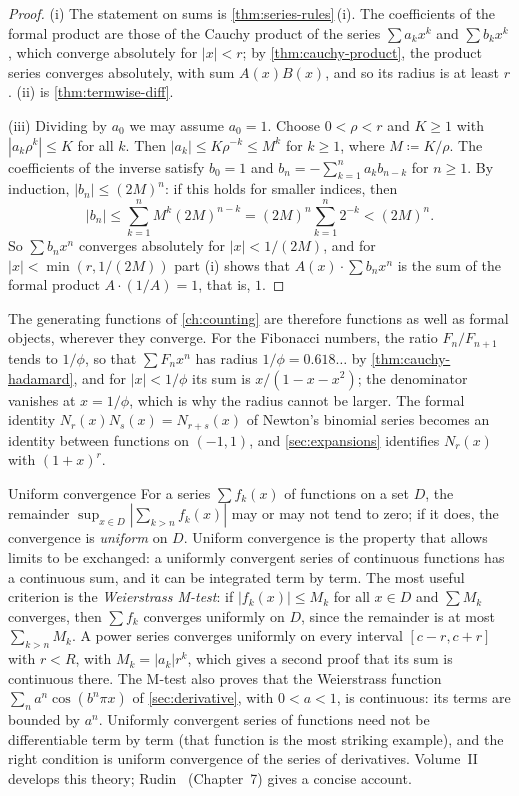 \begin{proof}
(i) The statement on sums is \cref{thm:series-rules}\,(i). The coefficients of the formal product are those of the Cauchy product of the series $\sum a_kx^k$ and $\sum b_kx^k$, which converge absolutely for $|x|<r$; by \cref{thm:cauchy-product}, the product series converges absolutely, with sum $A(x)B(x)$, and so its radius is at least $r$. (ii) is \cref{thm:termwise-diff}.

(iii) Dividing by $a_0$ we may assume $a_0=1$. Choose $0<\rho<r$ and $K\ge1$ with $|a_k\rho^k|\le K$ for all $k$. Then $|a_k|\le K\rho^{-k}\le M^k$ for $k\ge1$, where $M\coloneqq K/\rho$. The coefficients of the inverse satisfy $b_0=1$ and $b_n=-\sum_{k=1}^na_kb_{n-k}$ for $n\ge1$. By induction, $|b_n|\le(2M)^n$: if this holds for smaller indices, then
\[
|b_n|\le\sum_{k=1}^nM^k(2M)^{n-k}=(2M)^n\sum_{k=1}^n2^{-k}<(2M)^n .
\]
So $\sum b_nx^n$ converges absolutely for $|x|<1/(2M)$, and for $|x|<\min(r,1/(2M))$ part (i) shows that $A(x)\cdot\sum b_nx^n$ is the sum of the formal product $A\cdot(1/A)=1$, that is, $1$.
\end{proof}

The generating functions of \cref{ch:counting} are therefore functions as well as formal objects, wherever they converge. For the Fibonacci numbers, the ratio $F_n/F_{n+1}$ tends to $1/\phi$, so that $\sum F_nx^n$ has radius $1/\phi=0.618\ldots$ by \cref{thm:cauchy-hadamard}, and for $|x|<1/\phi$ its sum is $x/(1-x-x^2)$; the denominator vanishes at $x=1/\phi$, which is why the radius cannot be larger. The formal identity $N_r(x)N_s(x)=N_{r+s}(x)$ of Newton's binomial series becomes an identity between functions on $(-1,1)$, and \cref{sec:expansions} identifies $N_r(x)$ with $(1+x)^r$.

\begin{note}{Uniform convergence}
For a series $\sum f_k(x)$ of functions on a set $D$, the remainder $\sup_{x\in D}|\sum_{k>n}f_k(x)|$ may or may not tend to zero; if it does, the convergence is \emph{uniform} on $D$. Uniform convergence is the property that allows limits to be exchanged: a uniformly convergent series of continuous functions has a continuous sum, and it can be integrated term by term. The most useful criterion is the \emph{Weierstrass M-test}: if $|f_k(x)|\le M_k$ for all $x\in D$ and $\sum M_k$ converges, then $\sum f_k$ converges uniformly on $D$, since the remainder is at most $\sum_{k>n}M_k$. A power series converges uniformly on every interval $[c-r,c+r]$ with $r<R$, with $M_k=|a_k|r^k$, which gives a second proof that its sum is continuous there. The M-test also proves that the Weierstrass function $\sum_na^n\cos(b^n\pi x)$ of \cref{sec:derivative}, with $0<a<1$, is continuous: its terms are bounded by $a^n$. Uniformly convergent series of functions need not be differentiable term by term (that function is the most striking example), and the right condition is uniform convergence of the series of derivatives. Volume~II develops this theory; Rudin~\cite{rudin1976} (Chapter~7) gives a concise account.
\end{note}


